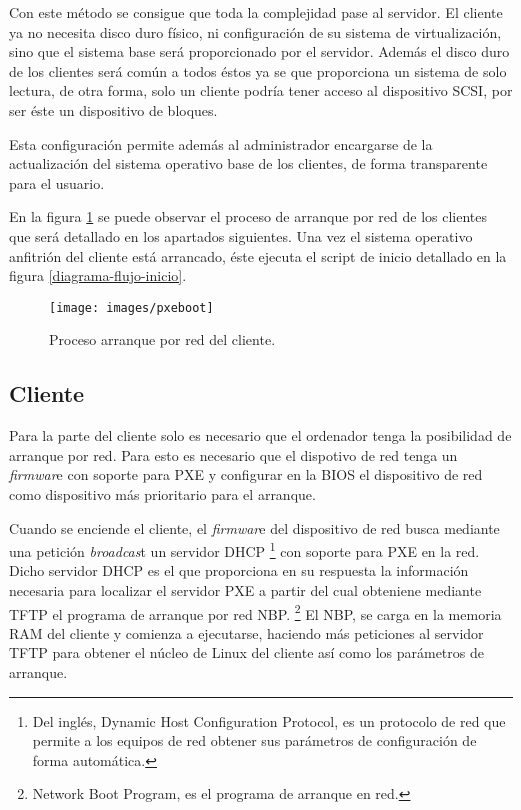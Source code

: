 \documentclass[spanisheDIVcalc,twoside,parskip-,pointlessnumbers,final]{scrbook}
\begin{document}
Con este método se consigue que toda la complejidad pase al servidor.
El cliente ya no necesita disco duro físico, ni configuración de su
sistema de virtualización, sino que el sistema base será proporcionado
por el servidor. Además el disco duro de los clientes será común a
todos éstos ya se que proporciona un sistema de solo lectura, de otra
forma, solo un cliente podría tener acceso al dispositivo SCSI, por
ser éste un dispositivo de bloques.

Esta configuración permite además al administrador encargarse de la
actualización del sistema operativo base de los clientes, de forma
transparente para el usuario.

En la figura \ref{proceso arranque por red de los clientes} se puede
observar el proceso de arranque por red de los clientes que será detallado
en los apartados siguientes. Una vez el sistema operativo anfitrión
del cliente está arrancado, éste ejecuta el script de inicio detallado
en la figura \ref{diagrama-flujo-inicio}.

\begin{figure}[htpb]
\begin{centering}
\texttt{[image: images/pxeboot]}
\par\end{centering}

\caption{Proceso arranque por red del cliente.}
\label{proceso arranque por red de los clientes}
\end{figure}



\subsection{Cliente}

Para la parte del cliente solo es necesario que el ordenador tenga
la posibilidad de arranque por red. Para esto es necesario que el
dispotivo de red tenga un \emph{firmwar}e con soporte para PXE y configurar
en la BIOS el dispositivo de red como dispositivo más prioritario
para el arranque.

Cuando se enciende el cliente, el \emph{firmwar}e del dispositivo
de red busca mediante una petición \emph{broadcas}t un servidor DHCP%
\footnote{Del inglés, Dynamic Host Configuration Protocol, es un protocolo de
red que permite a los equipos de red obtener sus parámetros de configuración
de forma automática.%
} con soporte para PXE en la red. Dicho servidor DHCP es el que proporciona
en su respuesta la información necesaria para localizar el servidor
PXE a partir del cual obteniene mediante TFTP el programa de arranque
por red NBP.%
\footnote{Network Boot Program, es el programa de arranque en red.%
} El NBP, se carga en la memoria RAM del cliente y comienza a ejecutarse,
haciendo más peticiones al servidor TFTP para obtener el núcleo de
Linux del cliente así como los parámetros de arranque.
\end{document}
